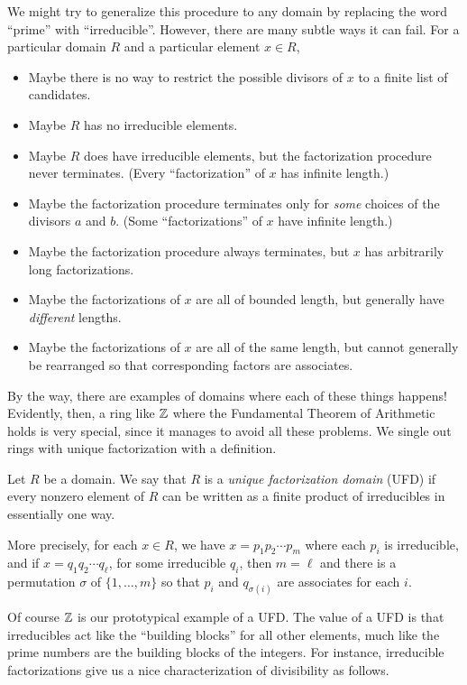 We might try to generalize this procedure to any domain by replacing the word ``prime'' with ``irreducible''.
However, there are many subtle ways it can fail.
For a particular domain \(R\) and a particular element \(x \in R\),
\begin{itemize}
\item Maybe there is no way to restrict the possible divisors of \(x\) to a finite list of candidates.
\item Maybe \(R\) has no irreducible elements.
\item Maybe \(R\) does have irreducible elements, but the factorization procedure never terminates.
(Every ``factorization'' of \(x\) has infinite length.)
\item Maybe the factorization procedure terminates only for \emph{some} choices of the divisors \(a\) and \(b\).
(Some ``factorizations'' of \(x\) have infinite length.)
\item Maybe the factorization procedure always terminates, but \(x\) has arbitrarily long factorizations.
\item Maybe the factorizations of \(x\) are all of bounded length, but generally have \emph{different} lengths.
\item Maybe the factorizations of \(x\) are all of the same length, but cannot generally be rearranged so that corresponding factors are associates.
\end{itemize}

By the way, there are examples of domains where each of these things happens! Evidently, then, a ring like \(\mathbb{Z}\) where the Fundamental Theorem of Arithmetic holds is very special, since it manages to avoid all these problems.
We single out rings with unique factorization with a definition.

\begin{dfn} \label{dfn:ufd}
Let \(R\) be a domain.
We say that \(R\) is a \emph{unique factorization domain} (UFD) if every nonzero element of \(R\) can be written as a finite product of irreducibles in essentially one way.

More precisely, for each \(x \in R\), we have \(x = p_1 p_2 \cdots p_m\) where each \(p_i\) is irreducible, and if \(x = q_1 q_2 \cdots q_\ell\), for some irreducible \(q_i\), then \(m = \ell\) and there is a permutation \(\sigma\) of \(\{1, \ldots, m\}\) so that \(p_i\) and \(q_{\sigma(i)}\) are associates for each \(i\).
\end{dfn}

Of course \(\mathbb{Z}\) is our prototypical example of a UFD.
The value of a UFD is that irreducibles act like the ``building blocks'' for all other elements, much like the prime numbers are the building blocks of the integers.
For instance, irreducible factorizations give us a nice characterization of divisibility as follows.

